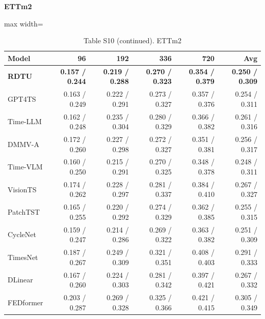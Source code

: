 \begin{table}[H]\centering\small
\caption*{Table S10 (continued). ETTm2}
\textbf{ETTm2}\par\smallskip
\begin{adjustbox}{max width=\linewidth}\begin{tabular}{lrrrrr}\toprule
\textbf{Model} & \textbf{96} & \textbf{192} & \textbf{336} & \textbf{720} & \textbf{Avg}\\\midrule
\rowcolor{blue!5}
\textbf{RDTU} & \textbf{0.157 / 0.244} & \textbf{0.219 / 0.288} & \textbf{0.270 / 0.323} & \textbf{0.354 / 0.379} & \textbf{0.250 / 0.309}\\
GPT4TS & 0.163 / 0.249 & 0.222 / 0.291 & 0.273 / 0.327 & 0.357 / 0.376 & 0.254 / 0.311\\
Time-LLM & 0.162 / 0.248 & 0.235 / 0.304 & 0.280 / 0.329 & 0.366 / 0.382 & 0.261 / 0.316\\
DMMV-A & 0.172 / 0.260 & 0.227 / 0.298 & 0.272 / 0.327 & 0.351 / 0.381 & 0.256 / 0.317\\
Time-VLM & 0.160 / 0.250 & 0.215 / 0.291 & 0.270 / 0.325 & 0.348 / 0.378 & 0.248 / 0.311\\
VisionTS & 0.174 / 0.262 & 0.228 / 0.297 & 0.281 / 0.337 & 0.384 / 0.410 & 0.267 / 0.327\\
PatchTST & 0.165 / 0.255 & 0.220 / 0.292 & 0.274 / 0.329 & 0.362 / 0.385 & 0.255 / 0.315\\
CycleNet & 0.159 / 0.247 & 0.214 / 0.286 & 0.269 / 0.322 & 0.363 / 0.382 & 0.251 / 0.309\\
TimesNet & 0.187 / 0.267 & 0.249 / 0.309 & 0.321 / 0.351 & 0.408 / 0.403 & 0.291 / 0.333\\
DLinear & 0.167 / 0.260 & 0.224 / 0.303 & 0.281 / 0.342 & 0.397 / 0.421 & 0.267 / 0.332\\
FEDformer & 0.203 / 0.287 & 0.269 / 0.328 & 0.325 / 0.366 & 0.421 / 0.415 & 0.305 / 0.349\\
\bottomrule\end{tabular}\end{adjustbox}\end{table}
